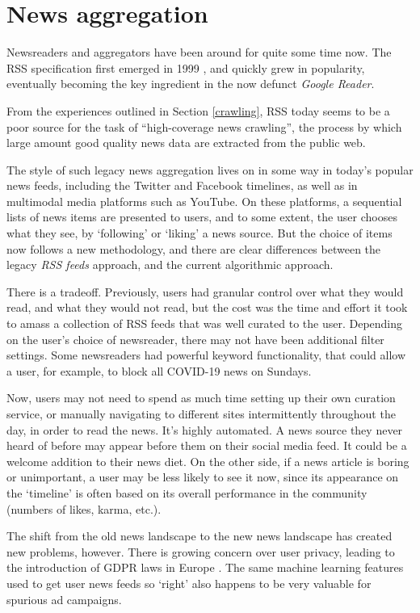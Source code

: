 \section{News aggregation}
Newsreaders and aggregators have been around for quite some time
now.  The RSS specification first emerged in 1999 \cite{rss1999},
and quickly grew in popularity, eventually becoming the key
ingredient in the now defunct {\it Google Reader}.

From the experiences outlined in Section \ref{crawling}, RSS today seems to
be a poor source for the task of ``high-coverage news
crawling'', the process by which large amount good quality
news data are extracted from the public web.

The style of such legacy news aggregation lives on in some way
in today's popular news feeds, including the Twitter and
Facebook timelines, as well as in multimodal media platforms such as
YouTube.  On these platforms, a sequential lists of news items are
presented to users, and to some extent, the user chooses what they see,
by `following' or `liking' a news source.  But the choice of items now
follows a new methodology, and there are clear differences between the
legacy {\it RSS feeds} approach, and the current algorithmic approach.

There is a tradeoff.  Previously, users had granular control over
what they would read, and what they would not read, but the cost
was the time and effort it took to amass a collection of RSS feeds
that was well curated to the user.  Depending on the user's choice
of newsreader, there may not have been additional filter settings.
Some newsreaders had powerful keyword functionality, that could allow
a user, for example, to block all COVID-19 news on Sundays.

Now, users may not need to
spend as much time setting up their own curation service, or
manually navigating to different sites intermittently throughout
the day, in order to read the news.  It's highly automated.  A news
source they never heard of before may appear before them on their
social media feed.  It could be a welcome addition to their news
diet.  On the other side, if a news article is boring or unimportant,
a user may be less likely to see it now, since its appearance on the
`timeline' is often based on its overall performance in the community
(numbers of likes, karma, etc.).

The shift from the old news landscape to the new news landscape has
created new problems, however.  There is growing concern over user
privacy, leading to the introduction of GDPR laws in Europe \cite{gdpr}.
The same machine learning features used to get user news feeds
so `right' also happens to be very valuable for spurious ad campaigns.

